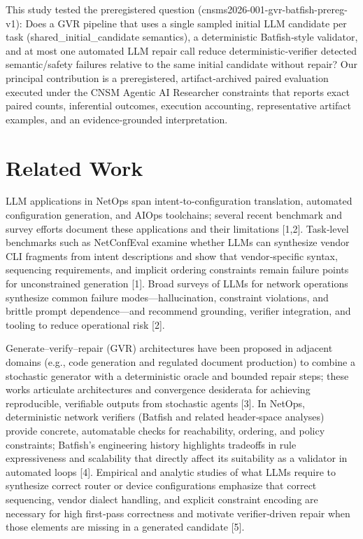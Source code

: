 \documentclass[conference]{IEEEtran}
\begin{document}
This study tested the preregistered question (cnsms2026-001-gvr-batfish-prereg-v1): Does a GVR pipeline that uses a single sampled initial LLM candidate per task (shared\_initial\_candidate semantics), a deterministic Batfish‑style validator, and at most one automated LLM repair call reduce deterministic‑verifier detected semantic/safety failures relative to the same initial candidate without repair? Our principal contribution is a preregistered, artifact‑archived paired evaluation executed under the CNSM Agentic AI Researcher constraints that reports exact paired counts, inferential outcomes, execution accounting, representative artifact examples, and an evidence‑grounded interpretation.

\section{Related Work}
LLM applications in NetOps span intent‑to‑configuration translation, automated configuration generation, and AIOps toolchains; several recent benchmark and survey efforts document these applications and their limitations [1,2]. Task‑level benchmarks such as NetConfEval examine whether LLMs can synthesize vendor CLI fragments from intent descriptions and show that vendor‑specific syntax, sequencing requirements, and implicit ordering constraints remain failure points for unconstrained generation [1]. Broad surveys of LLMs for network operations synthesize common failure modes---hallucination, constraint violations, and brittle prompt dependence---and recommend grounding, verifier integration, and tooling to reduce operational risk [2].

Generate--verify--repair (GVR) architectures have been proposed in adjacent domains (e.g., code generation and regulated document production) to combine a stochastic generator with a deterministic oracle and bounded repair steps; these works articulate architectures and convergence desiderata for achieving reproducible, verifiable outputs from stochastic agents [3]. In NetOps, deterministic network verifiers (Batfish and related header‑space analyses) provide concrete, automatable checks for reachability, ordering, and policy constraints; Batfish's engineering history highlights tradeoffs in rule expressiveness and scalability that directly affect its suitability as a validator in automated loops [4]. Empirical and analytic studies of what LLMs require to synthesize correct router or device configurations emphasize that correct sequencing, vendor dialect handling, and explicit constraint encoding are necessary for high first‑pass correctness and motivate verifier‑driven repair when those elements are missing in a generated candidate [5].
\end{document}
